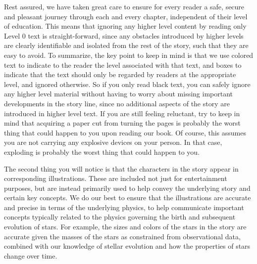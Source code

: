 \documentclass[main.tex]{subfiles}
\begin{document}
\par \nar Rest assured, we have taken great care to ensure for every reader a safe, secure and pleasant journey through each and every chapter, independent of their level of education.  This means that ignoring any higher level content by reading only Level 0 text is straight-forward, since any obstacles introduced by higher levels are clearly identifiable and isolated from the rest of the story, such that they are easy to avoid.  
To summarize, the key point to keep in mind is that we use colored text to indicate to the reader the level associated with that text, and boxes to indicate that the text should only be regarded by readers at the appropriate level, and ignored otherwise.  So if you only read black text, you can safely ignore any higher level material without having to worry about missing important developments in the story line, since no additional aspects of the story are introduced in higher level text.
If you are still feeling reluctant, try to keep in mind that acquiring a paper cut from turning the pages is probably the worst thing that could happen to you upon reading our book.  Of course, this assumes you are not carrying any explosive devices on your person. In that case, exploding is probably the worst thing that could happen to you.


\par \nar The second thing you will notice is that the characters in the story appear in corresponding illustrations.  These are included not just for entertainment purposes, but are instead primarily used to help convey the underlying story and certain key concepts.  We do our best to ensure that the illustrations are accurate and precise in terms of the underlying physics, to help communicate important concepts typically related to the physics governing the birth and subsequent evolution of stars.  For example, the sizes and colors of the stars in the story are accurate given the masses of the stars as constrained from observational data, combined with our knowledge of stellar evolution and how the properties of stars change over time.
\end{document}
